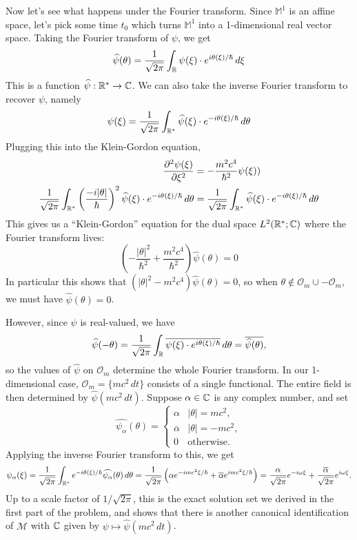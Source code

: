 \documentclass{pset}
\begin{document}
\begin{solution}
  Now let's see what happens under the Fourier transform. Since $\mathbb{M}^1$ is an affine space, let's pick some time $t_0$ which turns $\mathbb{M}^1$ into a 1-dimensional real vector space. Taking the Fourier transform of $\psi$, we get
  \[
    \widehat{\psi}(\theta) = \frac{1}{\sqrt{2\pi}}\int_{\mathbb{R}} \psi(\xi)\cdot e^{i\theta(\xi) / \hbar} \,d\xi
  \]
  This is a function $\widehat{\psi} : \mathbb{R}^* \to \mathbb{C}$. We can also take the inverse Fourier transform to recover $\psi$, namely
  \[
    \psi(\xi) = \frac{1}{\sqrt{2\pi}}\int_{\mathbb{R}^*} \widehat{\psi}(\xi)\cdot e^{-i\theta(\xi)/\hbar}\, d\theta
  \]
  Plugging this into the Klein-Gordon equation,
  \[
    \begin{aligned}
      \frac{\partial^2\psi(\xi)}{\partial \xi^2}&= - \frac{m^2c^4}{\hbar^2}\psi(\xi))\\
      \frac{1}{\sqrt{2\pi}}\int_{\mathbb{R}^*}\left(\frac{-i|\theta|}{\hbar}\right)^2\widehat{\psi}(\xi)\cdot e^{-i\theta(\xi)/\hbar}\,d\theta &= \frac{1}{\sqrt{2\pi}}\int_{\mathbb{R}^*}\widehat{\psi}(\xi)\cdot e^{-i\theta(\xi)/\hbar}\,d\theta\\
    \end{aligned}
  \]
  This gives us a ``Klein-Gordon'' equation for the dual space $L^2(\mathbb{R}^*; \mathbb{C})$ where the Fourier transform lives:
  \[
    \left(-\frac{|\theta|^2}{\hbar^2} + \frac{m^2 c^4}{\hbar^2}\right)\widehat{\psi}(\theta) = 0
  \]
  In particular this shows that $(|\theta|^2-m^2c^4)\widehat{\psi}(\theta)=0$, so when $\theta\not\in \mathcal{O}_m\cup -\mathcal{O}_m$, we must have $\widehat{\psi}(\theta)=0$. 

  However, since $\psi$ is real-valued, we have
  \[\widehat{\psi}(-\theta)=\frac{1}{\sqrt{2\pi}}\int_{\mathbb{R}}\overline{\psi(\xi)\cdot e^{i\theta(\xi)/\hbar}}\,d\theta = \overline{\widehat{\psi}(\theta)},\] 
  so the values of $\widehat{\psi}$ on $\mathcal{O}_m$ determine the whole Fourier transform. In our 1-dimensional case, $\mathcal{O}_m = \{ mc^2\,dt \}$ consists of a single functional. The entire field is then determined by $\widehat{\psi}(mc^2\,dt)$. Suppose $\alpha\in \mathbb{C}$ is any complex number, and set 
  \[
    \widehat{\psi_\alpha}(\theta) = \begin{cases} \alpha & |\theta| = mc^2,\\ \overline{\alpha} & |\theta|=-mc^2,\\ 0 &\textrm{otherwise}.\end{cases}
  \]
  Applying the inverse Fourier transform to this, we get
  \[
    \psi_\alpha(\xi) = \frac{1}{\sqrt{2\pi}}\int_{\mathbb{R}^*} e^{-i \theta(\xi) / \hbar}\widehat{\psi_\alpha}(\theta)\,d\theta = \frac{1}{\sqrt{2\pi}}\left(\alpha e^{-imc^2\xi/\hbar} + \overline{\alpha}e^{imc^2\xi/\hbar}\right) = \frac{\alpha}{\sqrt{2\pi}}e^{-i\omega \xi} + \frac{\overline{\alpha}}{\sqrt{2\pi}} e^{i\omega \xi}.
  \]
  Up to a scale factor of $1/\sqrt{2\pi}$, this is the exact solution set we derived in the first part of the problem, and shows that there is another canonical identification of $\mathcal{M}$ with $\mathbb{C}$ given by $\psi \mapsto \widehat{\psi}(mc^2\,dt)$.
\end{solution}
\end{document}
